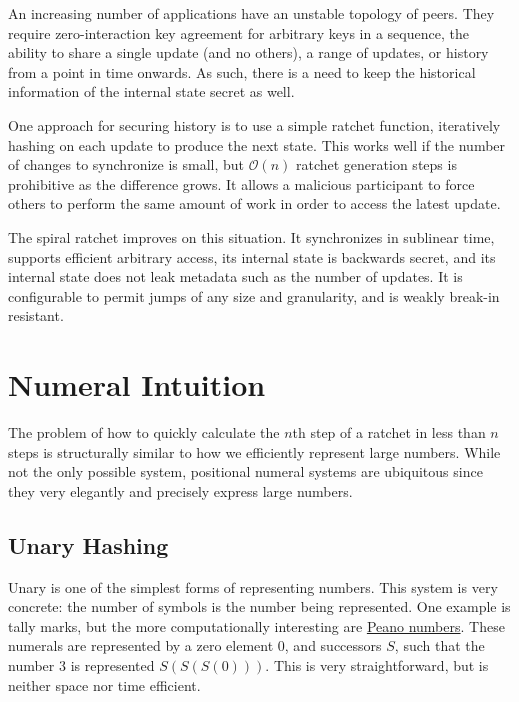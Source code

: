\documentclass{article}
\begin{document}
    An increasing number of applications have an unstable topology of peers. They require zero-interaction key agreement for arbitrary keys in a sequence, the ability to share a single update (and no others), a range of updates, or history from a point in time onwards. As such, there is a need to keep the historical information of the internal state secret as well.
    
    One approach for securing history is to use a simple ratchet function, iteratively hashing on each update to produce the next state. This works well if the number of changes to synchronize is small, but $\mathcal{O}(n)$ ratchet generation steps is prohibitive as the difference grows. It allows a malicious participant to force others to perform the same amount of work in order to access the latest update.
    
    The spiral ratchet improves on this situation. It synchronizes in sublinear time, supports efficient arbitrary access, its internal state is backwards secret, and its internal state does not leak metadata such as the number of updates. It is configurable to permit jumps of any size and granularity, and is weakly break-in resistant.
    
    \section{Numeral Intuition}
    
    The problem of how to quickly calculate the $n$th step of a ratchet in less than $n$ steps is structurally similar to how we efficiently represent large numbers. While not the only possible system, positional numeral systems are ubiquitous since they very elegantly and precisely express large numbers.
    
    \subsection{Unary Hashing}
   
    Unary is one of the simplest forms of representing numbers. This system is very concrete: the number of symbols is the number being represented. One example is tally marks, but the more computationally interesting are \href{https://en.wikipedia.org/wiki/Peano_axioms#Arithmetic}{Peano numbers}. These numerals are represented by a zero element 0, and successors $S$, such that the number 3 is represented $S(S(S(0)))$. This is very straightforward, but is neither space nor time efficient. 
    
\end{document}
